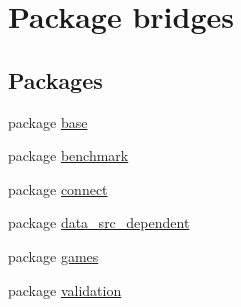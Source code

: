 \hypertarget{namespacebridges}{}\section{Package bridges}
\label{namespacebridges}
\subsection*{Packages}
\begin{DoxyCompactItemize}
\item 
package \mbox{\hyperlink{namespacebridges_1_1base}{base}}
\item 
package \mbox{\hyperlink{namespacebridges_1_1benchmark}{benchmark}}
\item 
package \mbox{\hyperlink{namespacebridges_1_1connect}{connect}}
\item 
package \mbox{\hyperlink{namespacebridges_1_1data__src__dependent}{data\+\_\+src\+\_\+dependent}}
\item 
package \mbox{\hyperlink{namespacebridges_1_1games}{games}}
\item 
package \mbox{\hyperlink{namespacebridges_1_1validation}{validation}}
\end{DoxyCompactItemize}
